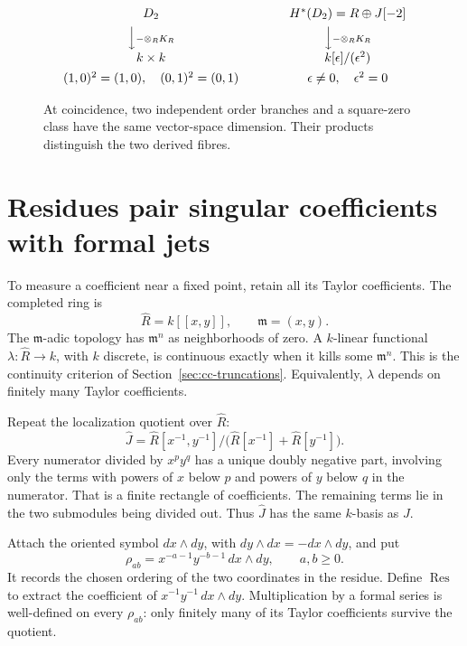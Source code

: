 \begin{figure}[H]
\centering
\[
\begin{array}{c@{\qquad\qquad}c}
 D_2 & H^*(D_2)=R\oplus J[-2]\\[4pt]
 \Big\downarrow\scriptstyle{-\otimes_RK_R}
 &\Big\downarrow\scriptstyle{-\otimes_RK_R}\\[4pt]
 k\times k & k[\epsilon]/(\epsilon^2)\\[4pt]
 (1,0)^2=(1,0),\quad(0,1)^2=(0,1)
 & \epsilon\ne0,\quad\epsilon^2=0
\end{array}
\]
\caption{At coincidence, two independent order branches and a square-zero
class have the same vector-space dimension. Their products distinguish
the two derived fibres.}
\end{figure}

\section{Residues pair singular coefficients with formal jets}

To measure a coefficient near a fixed point, retain all its Taylor
coefficients. The completed ring is
\[
 \widehat R=k[[x,y]],\qquad \mathfrak m=(x,y).
\]
The $\mathfrak m$-adic topology has $\mathfrak m^n$ as neighborhoods
of zero. A $k$-linear functional $\lambda:\widehat R\to k$, with
$k$ discrete, is continuous exactly when it kills some $\mathfrak m^n$.
This is the continuity criterion of Section~\ref{sec:cc-truncations}.
Equivalently, $\lambda$ depends on finitely many Taylor coefficients.

Repeat the localization quotient over $\widehat R$:
\[
 \widehat J=
 \widehat R[x^{-1},y^{-1}]/
 \bigl(\widehat R[x^{-1}]+\widehat R[y^{-1}]\bigr).
\]
Every numerator divided by $x^py^q$ has a unique doubly negative
part, involving only the terms with powers of $x$ below $p$ and
powers of $y$ below $q$ in the numerator.
That is a finite rectangle of coefficients.
The remaining terms lie in the two submodules being divided out.
Thus $\widehat J$ has the same $k$-basis as $J$.

Attach the oriented symbol $dx\wedge dy$, with
$dy\wedge dx=-dx\wedge dy$, and put
\[
 \rho_{ab}=x^{-a-1}y^{-b-1}\,dx\wedge dy,
 \qquad a,b\ge0.
\]
It records the chosen ordering of the two coordinates in the residue.
Define $\operatorname{Res}$ to extract the coefficient of
$x^{-1}y^{-1}\,dx\wedge dy$.
Multiplication by a formal series is well-defined on every $\rho_{ab}$:
only finitely many of its Taylor coefficients survive the quotient.

